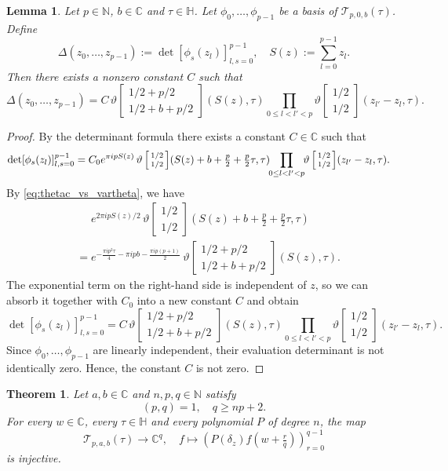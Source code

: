 \documentclass[reqno,a4paper,12pt]{amsart}
\numberwithin{equation}{section}
\newtheorem{theorem}[definition]{Theorem}
\newtheorem{lemma}[definition]{Lemma}
\newcommand{\N}{\mathbb N}
\newcommand{\C}{\mathbb C}
\newcommand{\HH}{\mathbb H}
\newcommand{\calT}{\mathcal T}
\newcommand{\dd}{\delta}
\newcommand{\thetac}[2]{{\vartheta\left[\begin{smallmatrix}
        #1 \\ #2
    \end{smallmatrix}\right]}}
\begin{document}
\begin{lemma}
\label{lem:frobenius}
Let $p\in\N$, $b\in\C$ and $\tau\in\HH$.
Let $\phi_0,\dots,\phi_{p-1}$ be a basis of $\calT_{p,0,b}(\tau)$. Define
$$
\Delta(z_0,\dots,z_{p-1})
:=
\det[\phi_s(z_l)]_{l,s=0}^{p-1},
\quad
S(z):=\sum_{l=0}^{p-1}z_{l}.
$$
Then there exists a nonzero constant $C$ such that
$$
\Delta(z_0,\dots,z_{p-1})
=
C\, \thetac{1/2+p/2}{1/2+b+p/2}(S(z), \tau) \prod\limits_{0\leq l <l'< p}\thetac{1/2}{1/2}(z_{l'}-z_l,\tau).
$$
\end{lemma}
\begin{proof} 
    By the determinant formula \cite[Prop.~3.4.]{RosengrenSchlosser2006} there exists a constant $C\in\C$ such that
    \begin{equation*}
       \begin{split}
           \det[\phi_s(z_l)]_{l,s=0}^{p-1} & = C_0 
           e^{\pi i p S(z)}\, \thetac{1/2}{1/2}(S(z) +b+\tfrac{p}{2}+\tfrac{p}{2}\tau, \tau) 
    \hspace{-3pt}\prod\limits_{0\leq l <l'< p}
           \hspace{-3pt}\thetac{1/2}{1/2}(z_{l'}-z_l,\tau).
       \end{split} 
    \end{equation*}
    By \eqref{eq:thetac_vs_vartheta}, we have
    \begin{equation}
 \begin{split}
        &\hspace{16pt}e^{2\pi i p S(z)/2}\, \thetac{1/2}{1/2}(S(z) +b+\tfrac{p}{2}+\tfrac{p}{2}\tau, \tau) \\
        & =
        e^{ -\frac{\pi i p^2 \tau}{4} - \pi i p b - \frac{\pi i p (p+1)}{2} }\, \thetac{1/2+p/2}{1/2+b+p/2}(S(z), \tau).
 \end{split}
    \end{equation}
    The exponential term on the right-hand side is independent of $z$, so we can absorb it together with $C_0$ into a new constant $ C$ and obtain
    \begin{equation}
        \det[\phi_s(z_l)]_{l,s=0}^{p-1} = C\, \thetac{1/2+p/2}{1/2+b+p/2}(S(z), \tau) \prod\limits_{0\leq l <l'<p}\thetac{1/2}{1/2}(z_{l'}-z_l,\tau).
    \end{equation}
Since $\phi_0,\dots ,\phi_{p-1}$ are linearly independent, their evaluation determinant is not identically zero. Hence, the constant $C$ is not zero.
\end{proof}

\begin{theorem}\label{thm:primitive-derivative}
Let $a,b\in\C$ and $n,p,q\in\N$ satisfy
$$
(p,q)=1,
\quad
q\geq {n}p+2.
$$
For every $w\in\C$, every $\tau \in \mathbb H$ and every polynomial $P$ of degree $n$, the map
$$
\calT_{p,a,b}(\tau)\to \C^q,
\quad
f \mapsto
\left({P(\dd_z)} f\left(w+\tfrac{r}{q}\right)\right)_{r=0}^{q-1}
$$
is injective.
\end{theorem}
\end{document}
